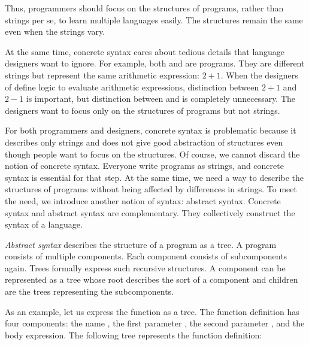 Thus, programmers should focus on the structures of programs, rather
than strings per se, to learn multiple languages easily. The structures
remain the same even when the strings vary.

At the same time, concrete syntax cares about tedious details that
language designers want to ignore. For example, both  and
 are \lang programs. They are different strings but
represent the same arithmetic expression: $2+1$. When the designers of
\lang define logic to evaluate arithmetic expressions, distinction
between $2+1$ and $2-1$ is important, but distinction between
 and  is completely unnecessary. The
designers want to focus only on the structures of programs but not
strings.

For both programmers and designers, concrete syntax is problematic
because it describes only strings and does not give good abstraction of
structures even though people want to focus on the structures. Of
course, we cannot discard the notion of concrete syntax. Everyone write
programs as strings, and concrete syntax is essential for that step. At
the same time, we need a way to describe the structures of programs
without being affected by differences in strings. To meet the need, we
introduce another notion of syntax: abstract syntax. Concrete syntax and
abstract syntax are complementary. They collectively construct the
syntax of a language.

\textit{Abstract syntax} describes the structure of a program as a tree. A program
consists of multiple components. Each component consists of subcomponents again.
Trees formally express such recursive structures. A component can be represented
as a tree whose root describes the sort of a component and children are the
trees representing the subcomponents.

As an example, let us express the function  as a tree. The function
definition has four components: the name , the first parameter
, the second parameter , and the body expression. The following
tree represents the function definition:

\begin{center}
\end{center}

